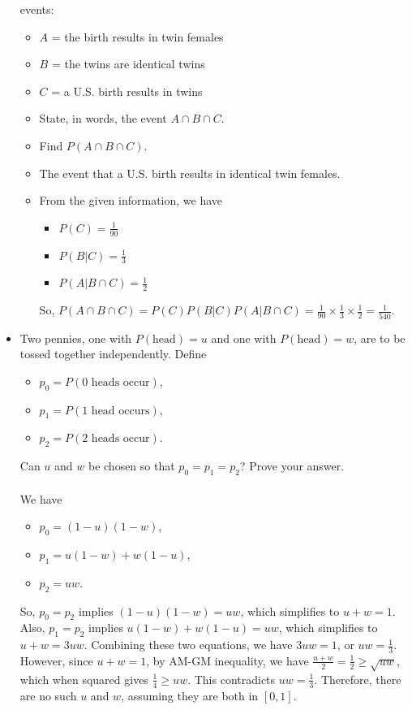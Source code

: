 \documentclass[12pt]{article}
\newenvironment{problem}[2][Problem]{\begin{trivlist}
\item[\hskip \labelsep {\bfseries #1}\hskip \labelsep {\bfseries #2.}]}
{\end{trivlist}}
\begin{document}
\begin{problem}{1}
\begin{itemize}
    events:
      \begin{itemize}
        \item $A$ = {the birth results in twin females}
        \item $B$ = {the twins are identical twins}
        \item $C$ = {a U.S. birth results in twins}
      \end{itemize}
      \begin{itemize}
        \item[(a)] State, in words, the event $A \cap B \cap C$.
        \item[(b)] Find $P(A \cap B \cap C)$.
      \end{itemize}
      \begin{itemize}
        \item[(a)] The event that a U.S. birth results in identical
        twin females.
        \item[(b)] From the given information, we have
        \begin{itemize}
          \item $P(C) = \frac{1}{90}$
          \item $P(B|C) = \frac{1}{3}$
          \item $P(A|B \cap C) = \frac{1}{2}$
        \end{itemize}
        So, $P(A \cap B \cap C) = P(C)P(B|C)P(A|B \cap C) = \frac{1}{90} \times
        \frac{1}{3} \times \frac{1}{2} = \frac{1}{540}$.
      \end{itemize} 
    \item[6] Two pennies, one with $P(\text{head}) = u$ and one with
    $P(\text{head}) = w$, are to be tossed together independently. Define
    \begin{itemize}
      \item $p_0 = P(\text{0 heads occur})$,
      \item $p_1 = P(\text{1 head occurs})$,
      \item $p_2 = P(\text{2 heads occur})$.
    \end{itemize}
    Can $u$ and $w$ be chosen so that $p_0 = p_1 = p_2$? Prove your answer.
    \\\\
    We have
    \begin{itemize}
      \item $p_0 = (1-u)(1-w)$,
      \item $p_1 = u(1-w) + w(1-u)$,
      \item $p_2 = uw$.
    \end{itemize}
    So, $p_0 = p_2$ implies $(1-u)(1-w) = uw$, which simplifies to
    $u + w = 1$. Also, $p_1 = p_2$ implies $u(1-w) + w(1-u) = uw$, which
    simplifies to $ u + w = 3uw$. Combining these two equations, we have
    $3uw = 1$, or $uw = \frac{1}{3}$. However, since $u + w = 1$, by AM-GM
    inequality, we have $\frac{u+w}{2} = \frac{1}{2} \ge \sqrt{uw}$, which
    when squared gives $\frac{1}{4} \ge uw$. This
    contradicts $uw = \frac{1}{3}$. Therefore, there are no such $u$ and $w$,
    assuming they are both in $[0,1]$.
  \end{itemize}
\end{problem}
\end{document}
